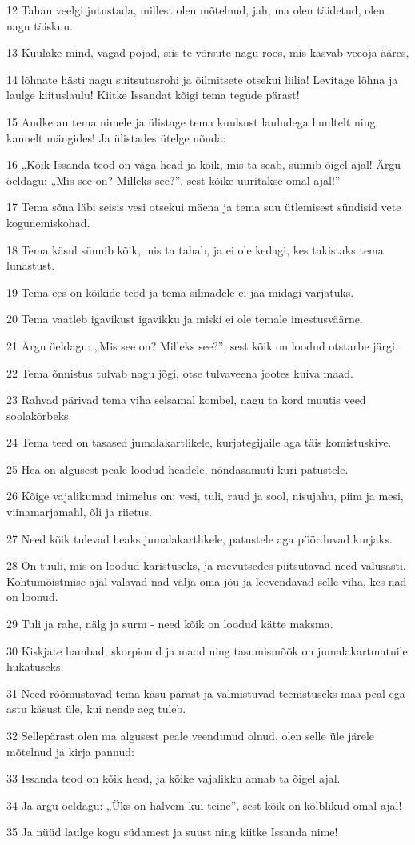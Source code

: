 \par 12 Tahan veelgi jutustada, millest olen mõtelnud, jah, ma olen täidetud, olen nagu täiskuu.
\par 13 Kuulake mind, vagad pojad, siis te võrsute nagu roos, mis kasvab veeoja ääres,
\par 14 lõhnate hästi nagu suitsutusrohi ja õilmitsete otsekui liilia! Levitage lõhna ja laulge kiituslaulu! Kiitke Issandat kõigi tema tegude pärast!
\par 15 Andke au tema nimele ja ülistage tema kuulsust lauludega huultelt ning kannelt mängides! Ja ülistades ütelge nõnda:
\par 16 „Kõik Issanda teod on väga head ja kõik, mis ta seab, sünnib õigel ajal! Ärgu öeldagu: „Mis see on? Milleks see?”, sest kõike uuritakse omal ajal!”
\par 17 Tema sõna läbi seisis vesi otsekui mäena ja tema suu ütlemisest sündisid vete kogunemiskohad.
\par 18 Tema käsul sünnib kõik, mis ta tahab, ja ei ole kedagi, kes takistaks tema lunastust.
\par 19 Tema ees on kõikide teod ja tema silmadele ei jää midagi varjatuks.
\par 20 Tema vaatleb igavikust igavikku ja miski ei ole temale imestusväärne.
\par 21 Ärgu öeldagu: „Mis see on? Milleks see?”, sest kõik on loodud otstarbe järgi.
\par 22 Tema õnnistus tulvab nagu jõgi, otse tulvaveena jootes kuiva maad.
\par 23 Rahvad pärivad tema viha selsamal kombel, nagu ta kord muutis veed soolakõrbeks.
\par 24 Tema teed on tasased jumalakartlikele, kurjategijaile aga täis komistuskive.
\par 25 Hea on algusest peale loodud headele, nõndasamuti kuri patustele.
\par 26 Kõige vajalikumad inimelus on: vesi, tuli, raud ja sool, nisujahu, piim ja mesi, viinamarjamahl, õli ja riietus.
\par 27 Need kõik tulevad heaks jumalakartlikele, patustele aga pöörduvad kurjaks.
\par 28 On tuuli, mis on loodud karistuseks, ja raevutsedes piitsutavad need valusasti. Kohtumõistmise ajal valavad nad välja oma jõu ja leevendavad selle viha, kes nad on loonud.
\par 29 Tuli ja rahe, nälg ja surm - need kõik on loodud kätte maksma.
\par 30 Kiskjate hambad, skorpionid ja maod ning tasumismõõk on jumalakartmatuile hukatuseks.
\par 31 Need rõõmustavad tema käsu pärast ja valmistuvad teenistuseks maa peal ega astu käsust üle, kui nende aeg tuleb.
\par 32 Sellepärast olen ma algusest peale veendunud olnud, olen selle üle järele mõtelnud ja kirja pannud:
\par 33 Issanda teod on kõik head, ja kõike vajalikku annab ta õigel ajal.
\par 34 Ja ärgu öeldagu: „Üks on halvem kui teine”, sest kõik on kõlblikud omal ajal!
\par 35 Ja nüüd laulge kogu südamest ja suust ning kiitke Issanda nime!


